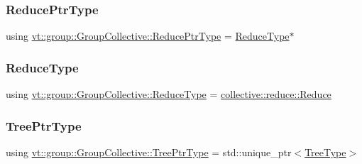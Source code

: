 \mbox{\label{structvt_1_1group_1_1_group_collective_a55049a9850a6110ef8ad388a6b2adafc}} 
\subsubsection{\texorpdfstring{Reduce\+Ptr\+Type}{ReducePtrType}}
{\footnotesize\ttfamily using \hyperlink{structvt_1_1group_1_1_group_collective_a55049a9850a6110ef8ad388a6b2adafc}{vt\+::group\+::\+Group\+Collective\+::\+Reduce\+Ptr\+Type} =  \hyperlink{structvt_1_1group_1_1_group_collective_acc03682a21dc3e4293720c0f6677c88d}{Reduce\+Type}$\ast$}

\mbox{\label{structvt_1_1group_1_1_group_collective_acc03682a21dc3e4293720c0f6677c88d}} 
\subsubsection{\texorpdfstring{Reduce\+Type}{ReduceType}}
{\footnotesize\ttfamily using \hyperlink{structvt_1_1group_1_1_group_collective_acc03682a21dc3e4293720c0f6677c88d}{vt\+::group\+::\+Group\+Collective\+::\+Reduce\+Type} =  \hyperlink{structvt_1_1collective_1_1reduce_1_1_reduce}{collective\+::reduce\+::\+Reduce}}

\mbox{\label{structvt_1_1group_1_1_group_collective_a2e02dc375f193620af9832f187029188}} 
\subsubsection{\texorpdfstring{Tree\+Ptr\+Type}{TreePtrType}}
{\footnotesize\ttfamily using \hyperlink{structvt_1_1group_1_1_group_collective_a2e02dc375f193620af9832f187029188}{vt\+::group\+::\+Group\+Collective\+::\+Tree\+Ptr\+Type} =  std\+::unique\+\_\+ptr$<$\hyperlink{structvt_1_1group_1_1_group_collective_abae59cc0eb4512145a039fb47fff6a25}{Tree\+Type}$>$}

